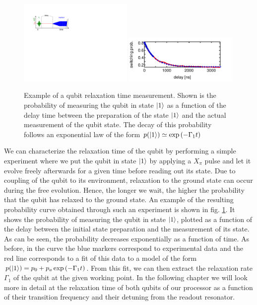 \begin{figure}[ht!]
\centering
\includegraphics[width=0.49\textwidth]{"./material/figures/measurement/qubit_t1_measurement"}
\includegraphics[width=0.49\textwidth]{"./data/ct5/2011_04_21 - grover and tomo/example - qubit 2 t1"}
\caption[]{Example of a qubit relaxation time measurement. Shown is the probability of measuring the qubit in state $\left| 1 \right>$ as a function of the delay time between the preparation of the state $\left| 1 \right>$ and the actual measurement of the qubit state. The decay of this probability follows an exponential law of the form $p(\left| 1 \right>)\simeq\exp{(-\Gamma_1 t)}$}
\label{fig:qubit_t1_example}
\end{figure}

We can characterize the relaxation time of the qubit by performing a simple experiment where we put the qubit in state $\left| 1 \right>$ by applying a $X_{\pi}$ pulse and let it evolve freely afterwards for a given time before reading out its state. Due to coupling of the qubit to its environment, relaxation to the ground state can occur during the free evolution. Hence, the longer we wait, the higher the probability that the qubit has relaxed to the ground state. An example of the resulting probability curve obtained through such an experiment is shown in fig. \ref{fig:qubit_t1_example}. It shows the probability of measuring the qubit in state $\left| 1 \right>$, plotted as a function of the delay between the initial state preparation and the measurement of its state. As can be seen, the probability decreases exponentially as a function of time. As before, in the curve the blue markers correspond to experimental data and the red line corresponds to a fit of this data to a model of the form $p(\left| 1 \right>) = p_0+p_a\exp{(-\Gamma_1 t)}$. From this fit, we can then extract the relaxation rate $\Gamma_1$ of the qubit at the given working point. In the following chapter we will look more in detail at the relaxation time of both qubits of our processor as a function of their transition frequency and their detuning from the readout resonator.